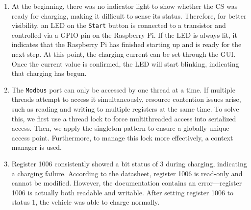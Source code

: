 \documentclass[
	english,
	ruledheaders=section,%
	class=report,%
	thesis={type=Report},%
	accentcolor=9c,%
	custommargins=true,%
	marginpar=false,%
	parskip=half-,%
	fontsize=11pt,%
	logofile={img/tuda_logo.pdf}, %
]{tudapub}
\begin{document}
\begin{enumerate}
  \item At the beginning, there was no indicator light to show whether the \ac{CS} was ready for charging, making it difficult to sense its status. Therefore, for better visibility, an LED on the \texttt{Start} button is connected to a transistor and controlled via a GPIO pin on the Raspberry Pi. If the LED is always lit, it indicates that the Raspberry Pi has finished starting up and is ready for the next step. At this point, the charging current can be set through the \ac{GUI}. Once the current value is confirmed, the LED will start blinking, indicating that charging has begun.

   \item The \texttt{Modbus} port can only be accessed by one thread at a time. If multiple threads attempt to access it simultaneously, resource contention issues arise, such as reading and writing to multiple registers at the same time. To solve this, we first use a thread lock to force multithreaded access into serialized access. Then, we apply the singleton pattern to ensure a globally unique access point. Furthermore, to manage this lock more effectively, a context manager is used.

   \item Register 1006 consistently showed a bit status of 3 during charging, indicating a charging failure. According to the datasheet, register 1006 is read-only and cannot be modified. However, the documentation contains an error—register 1006 is actually both readable and writable. After setting register 1006 to status 1, the vehicle was able to charge normally.

\end{enumerate}


\end{document}

